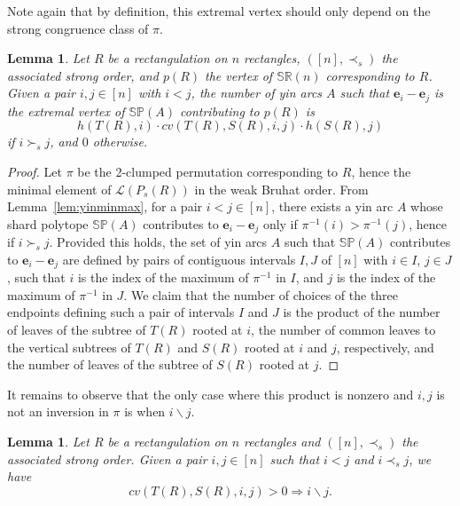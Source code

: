 \documentclass{amsart}
\newtheorem{lemma}[theorem]{Lemma}
\theoremstyle{definition}
\renewcommand{\implies}{\Rightarrow} %
\newcommand{\polytope}[1]{\mathds{#1}} %
\newcommand{\SRP}{\polytope{SR}} %
\newcommand{\SP}{\polytope{SP}}
\begin{document}
Note again that by definition, this extremal vertex should only depend on the strong congruence class of $\pi$.

\begin{lemma}
  Let $R$ be a rectangulation on $n$ rectangles, $([n],\prec_s)$ the associated strong order, and $p(R)$ the vertex of $\SRP(n)$ corresponding to $R$.
  Given a pair $i,j\in [n]$ with $i<j$, the number of yin arcs $A$ such that $\mathbf{e}_i-\mathbf{e}_j$
  is the extremal vertex of $\SP(A)$ contributing to $p(R)$ is
  \[
    h(T(R), i) \cdot cv (T(R), S(R), i, j)\cdot h(S(R), j) 
  \]
  if $i\succ_s j$, and $0$ otherwise.
\end{lemma}
\begin{proof}
  Let $\pi$ be the 2-clumped permutation corresponding to $R$, hence the minimal element of $\mathcal{L}(P_s(R))$ in the weak Bruhat order.
  From Lemma~\ref{lem:yinminmax}, for a pair $i<j \in [n]$, there exists a yin arc $A$ whose shard polytope $\SP(A)$ contributes to $\mathbf{e}_i-\mathbf{e}_j$ only if
  $\pi^{-1}(i)>\pi^{-1}(j)$, hence if $i\succ_s j$.
  Provided this holds, the set of yin arcs $A$ such that $\SP(A)$ contributes to $\mathbf{e}_i-\mathbf{e}_j$ are defined by pairs of contiguous intervals $I,J$ of $[n]$ with $i\in I$, $j\in J$, such that $i$ is the index of the maximum of $\pi^{-1}$ in $I$, and $j$ is the index of the maximum of $\pi^{-1}$ in $J$.
  We claim that the number of choices of the three endpoints defining such a pair of intervals $I$ and $J$ is the product of the
  number of leaves of the subtree of $T(R)$ rooted at $i$, the number of common leaves to the vertical subtrees of $T(R)$ and $S(R)$ rooted
  at $i$ and $j$, respectively, and the number of leaves of the subtree of $S(R)$ rooted at $j$.
\end{proof}

It remains to observe that the only case where this product is nonzero and $i,j$ is not an inversion in $\pi$ is when $i\backslash j$.

\begin{lemma}
  Let $R$ be a rectangulation on $n$ rectangles and $([n],\prec_s)$ the associated strong order.
  Given a pair $i,j\in [n]$ such that $i<j$ and $i\prec_s j$, we have
  \[
    cv (T(R), S(R), i, j) > 0 \implies i\backslash j.
  \]
\end{lemma}



{}


\label{sec:biblio}
\end{document}
